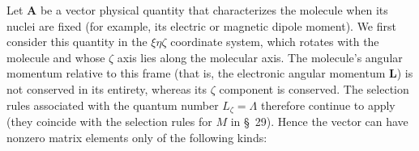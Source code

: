 Let $\mathbf A$ be a vector physical quantity that characterizes the molecule when its nuclei are fixed (for example, its electric or magnetic dipole moment). We first consider this quantity in the $\xi\eta\zeta$ coordinate system, which rotates with the molecule and whose $\zeta$ axis lies along the molecular axis. The molecule's angular momentum relative to this frame (that is, the electronic angular momentum $\mathbf L$) is not conserved in its entirety, whereas its $\zeta$ component is conserved. The selection rules associated with the quantum number $L_\zeta=\Lambda$ therefore continue to apply (they coincide with the selection rules for $M$ in \S~29). Hence the vector can have nonzero matrix elements only of the following kinds:
